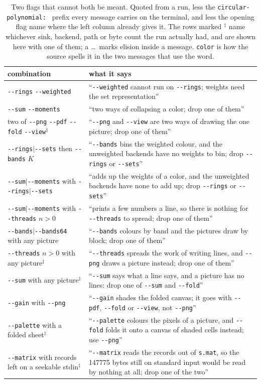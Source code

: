 \documentclass[11pt,a4paper]{article}
\newcommand{\flag}[1]{\texttt{-{}-#1}}
\begin{document}
\begin{table}[p]
\centering\small
\begin{tabular}{p{}p{}}
\toprule
combination & what it says \\
\midrule
\flag{rings} \flag{weighted} & ``\flag{weighted} cannot run on \flag{rings}; weights need the set representation'' \\
\flag{sum} \flag{moments} & ``two ways of collapsing a color; drop one of them'' \\
two of \flag{png} \flag{pdf} \flag{fold} \flag{view}$^\ddagger$ & ``\flag{png} and \flag{view} are two ways of drawing the one picture; drop one of them'' \\
\flag{rings}$|$\flag{sets} then \flag{bands} $K$ & ``\flag{bands} bins the weighted colour, and the unweighted backends have no weights to bin; drop \flag{rings} or \flag{sets}'' \\
\flag{sum}$|$\flag{moments} with \flag{rings}$|$\flag{sets} & ``adds up the weights of a color, and the unweighted backends have none to add up; drop \flag{rings} or \flag{sets}'' \\
\flag{sum}$|$\flag{moments} with \flag{threads} $n>0$ & ``prints a few numbers a line, so there is nothing for \flag{threads} to spread; drop one of them'' \\
\flag{bands}$|$\flag{bands64} with any picture & ``\flag{bands} colours by band and the pictures draw by block; drop one of them'' \\
\flag{threads} $n>0$ with any picture$^\ddagger$ & ``\flag{threads} spreads the work of writing lines, and \flag{png} draws a picture instead; drop one of them'' \\
\flag{sum} with any picture$^\ddagger$ & ``\flag{sum} says what a line says, and a picture has no lines: drop one of \flag{sum} and \flag{fold}'' \\
\flag{gain} with \flag{png} & ``\flag{gain} shades the folded canvas; it goes with \flag{pdf}, \flag{fold} or \flag{view}, not \flag{png}'' \\
\flag{palette} with a folded sheet$^\ddagger$ & ``\flag{palette} colours the pixels of a picture, and \flag{fold} folds it onto a canvas of shaded cells instead; use \flag{png}'' \\
\flag{matrix} with records left on a seekable stdin$^\ddagger$ & ``\flag{matrix} reads the records out of \texttt{s.mat}, so the 147775 bytes still on standard input would be read by nothing at all; drop one of the two'' \\
\bottomrule
\end{tabular}
\caption{Two flags that cannot both be meant. Quoted from a run, less the
\texttt{circular-polynomial:\ } prefix every message carries on the terminal,
and less the opening flag name where the left column already gives it. The
rows marked $^\ddagger$ name whichever sink, backend, path or byte count the
run actually had, and are shown here with one of them; a \ldots\ marks
elision inside a message. \texttt{color} is how the source spells it in the two
messages that use the word.}
\label{tab:refusals-meaning}
\end{table}
\end{document}
